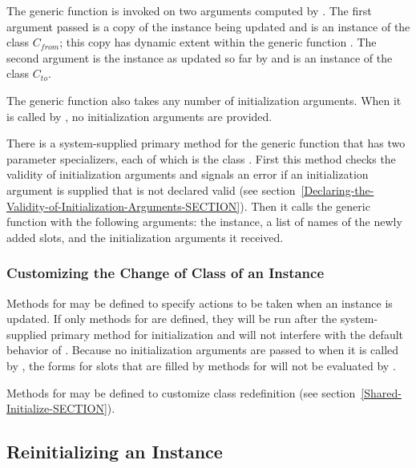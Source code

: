 The generic function  is
invoked on two arguments computed by .  The first
argument passed is a copy of the instance being updated and is an
instance of the class $C_{from}$; this copy has
dynamic extent within the generic function .  The
second argument is the instance as updated so far by 
and is an instance of the class $C_{to}$.

The generic function  also
takes any number of initialization arguments.  When it is called by
, no initialization arguments are provided.

There is a system-supplied primary method for the generic function
 that has two parameter
specializers, each of which is the class .  First
this method checks the validity of initialization arguments and
signals an error if an initialization argument is supplied that is not
declared valid (see section~\ref{Declaring-the-Validity-of-Initialization-Arguments-SECTION}).
Then it calls the
generic function  with the following arguments:
the instance, a list of names of the newly added slots, and the
initialization arguments it received.

\subsubsection{Customizing the Change of Class of an Instance}

Methods for  may be defined
to specify actions to be taken when an instance is updated.  If only
 methods for  are
defined, they will be run after the system-supplied primary method for
initialization and will not interfere with the default behavior of
.  Because no initialization
arguments are passed to  when
it is called by , the  forms for slots
that are filled by  methods for 
 will not be evaluated by 
.

Methods for  may be defined to customize class
redefinition (see section~\ref{Shared-Initialize-SECTION}).

\subsection{Reinitializing an Instance}
\label{Reinitializing-an-Instance-SECTION}

